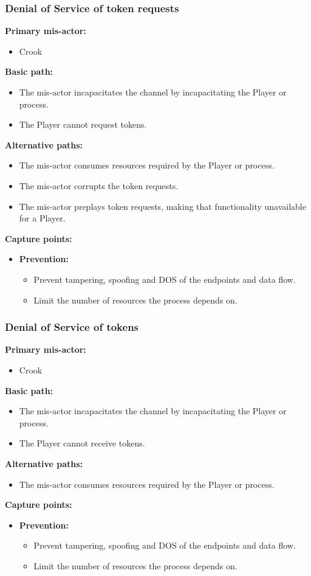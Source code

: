 \documentclass[a4paper,11pt]{report}
\begin{document}
\subsubsection{Denial of Service of token requests}
\label{PlayerFlowCasesD1}
\textbf{Primary mis-actor:}
\begin{itemize}
\item Crook
\end{itemize}
\textbf{Basic path:}
\begin{itemize}
\item The mis-actor incapacitates the channel by incapacitating the Player or process.
\item The Player cannot request tokens.
\end{itemize}
\textbf{Alternative paths:}
\begin{itemize}
\item The mis-actor consumes resources required by the Player or process.
\item The mis-actor corrupts the token requests.
\item The mis-actor preplays token requests, making that functionality unavailable for a Player.
\end{itemize}
\textbf{Capture points:}
\begin{itemize}
\item \textbf{Prevention:}
\begin{itemize}
\item Prevent tampering, spoofing and DOS of the endpoints and data flow.
\item Limit the number of resources the process depends on.
\end{itemize}
\end{itemize}

\subsubsection{Denial of Service of tokens}
\label{PlayerFlowCasesD2}
\textbf{Primary mis-actor:}
\begin{itemize}
\item Crook
\end{itemize}
\textbf{Basic path:}
\begin{itemize}
\item The mis-actor incapacitates the channel by incapacitating the Player or process.
\item The Player cannot receive tokens.
\end{itemize}
\textbf{Alternative paths:}
\begin{itemize}
\item The mis-actor consumes resources required by the Player or process.
\end{itemize}
\textbf{Capture points:}
\begin{itemize}
\item \textbf{Prevention:}
\begin{itemize}
\item Prevent tampering, spoofing and DOS of the endpoints and data flow.
\item Limit the number of resources the process depends on.
\end{itemize}
\end{itemize}
\end{document}
